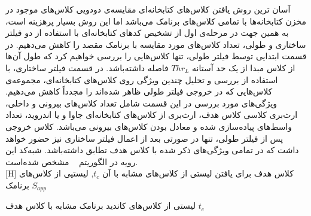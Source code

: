 آسان ‌ترین روش یافتن کلاس‌های کتابخانه‌ای مقایسه‌ی دودویی کلاس‌های موجود در مخزن کتابخانه‌ها با تمامی کلاس‌های برنامک می‌باشد اما این روش بسیار پرهزینه‌ است، به همین جهت در مرحله‌ی اول از تشخیص کد‌های کتابخانه‌ای با استفاده از دو فیلتر ساختاری و طولی، تعداد کلاس‌های مورد مقایسه با برنامک مقصد را کاهش می‌دهیم. در قسمت ابتدایی توسط فیلتر طولی، تنها کلاس‌هایی را بررسی خواهیم کرد که طول آن‌ها از کلاس مبدا از یک حد آستانه $Thr_L$ فاصله‌ داشته‌باشد. در قسمت فیلتر ساختاری، با استفاده از بررسی و تحلیل چندین ویژگی روی کلاس‌های کتابخانه‌ای، مجموعه‌ی کلاس‌هایی که در خروجی فیلتر طولی ظاهر شده‌اند را مجدداً کاهش می‌دهیم. ویژگی‌های مورد بررسی در این قسمت شامل تعداد کلاس‌های بیرونی و داخلی، ارث‌بری کلاسی کلاس هدف، ارث‌بری از کلاس‌های کتابخانه‌ای جاوا و یا اندروید، تعداد واسط‌های پیاده‌سازی شده و معادل بودن کلاس‌های بیرونی می‌باشد. کلاس خروجی پس از فیلتر طولی، تنها در صورتی بعد از اعمال فیلتر ساختاری نیز حضور خواهد داشت که در تمامی ویژگی‌های ذکر شده با کلاس هدف تطابق داشته‌باشد. شبه‌کد این رویه در الگوریتم ~ مشخص شده‌‌است. \\ 
[H]
\vspace{1em}
 کلاس هدف برای یافتن لیستی از کلاس‌های مشابه با آن $t_c$, لیستیی از کلاس‌های برنامک $S_{app}$

 لیستی از کلاس‌های کاندید برنامک مشابه با کلاس هدف $t_c$

